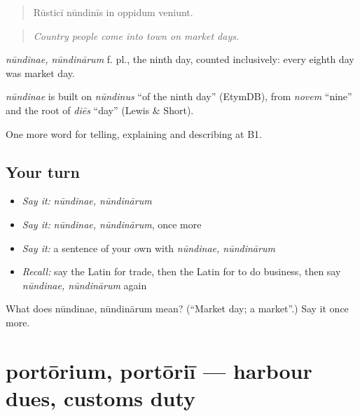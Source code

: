 \begin{quote}
Rūsticī nūndinīs in oppidum veniunt.
\end{quote}

\begin{quote}
\emph{Country people come into town on market days.}
\end{quote}

\emph{nūndinae, nūndinārum} f. pl., the ninth day, counted inclusively: every eighth day was market day.

\begin{cousinweb}
\emph{nūndinae} is built on \emph{nūndinus} \textquotedblleft{}of the ninth day\textquotedblright{} (EtymDB), from \emph{novem} \textquotedblleft{}nine\textquotedblright{} and the root of \emph{diēs} \textquotedblleft{}day\textquotedblright{} (Lewis \& Short).
\end{cousinweb}

\begin{grammarlens}[title={What you've built}]
One more word for telling, explaining and describing at B1.
\end{grammarlens}

\subsection*{Your turn}
\begin{itemize}
\raggedright
  \item \emph{Say it:} \emph{nūndinae, nūndinārum}
  \item \emph{Say it:} \emph{nūndinae, nūndinārum}, once more
  \item \emph{Say it:} a sentence of your own with \emph{nūndinae, nūndinārum}
  \item \emph{Recall:} say the Latin for trade, then the Latin for to do business, then say \emph{nūndinae, nūndinārum} again
\end{itemize}

\begin{tcolorbox}[breakable,colback=teal!4,colframe=teal!35!black,title={Before you move on}]
What does nūndinae, nūndinārum mean? (\textquotedblleft{}Market day; a market\textquotedblright{}.) Say it once more.
\end{tcolorbox}
\section[portōrium, portōriī]{portōrium, portōriī — harbour dues, customs duty}

